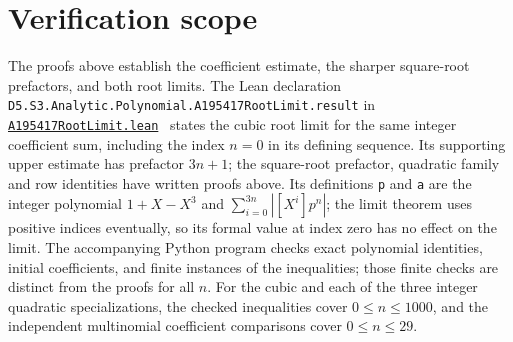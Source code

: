 \documentclass[11pt]{article}
\begin{document}
\section{Verification scope}
The proofs above establish the coefficient estimate, the sharper square-root
prefactors, and both root limits. The Lean declaration
\texttt{D5.S3.Analytic.Polynomial.A195417RootLimit.result}
in \href{https://github.com/the-omega-institute/trureturing/blob/6bdbb68454659fcccffc7607b5fc292b2ff2fcdf/D5/S3/Analytic/Polynomial/A195417RootLimit.lean}{\texttt{A195417RootLimit.lean}}~\cite{lean}
states the cubic root limit for the
same integer coefficient sum, including the index $n=0$ in its defining
sequence. Its supporting upper estimate has prefactor $3n+1$;
the square-root prefactor, quadratic family and row identities have
written proofs above. Its definitions \texttt{p} and \texttt{a}
are the integer polynomial $1+X-X^3$ and
$\sum_{i=0}^{3n}|[X^i]p^n|$; the limit theorem uses positive indices
eventually, so its formal value at index zero has no effect on the limit.
The accompanying Python program checks exact polynomial identities,
initial coefficients, and finite instances of the inequalities; those
finite checks are distinct from the proofs for all $n$.
For the cubic and each of the three integer quadratic specializations,
the checked inequalities cover $0\leq n\leq1000$, and the independent
multinomial coefficient comparisons cover $0\leq n\leq29$.
\end{document}

